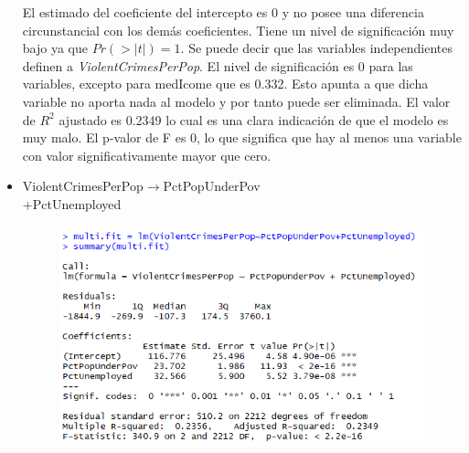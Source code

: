 \documentclass[a4paper,10pt,twocolumn]{article}
\begin{document}
\begin{itemize}
	El estimado del coeficiente del intercepto es 0 y no posee una diferencia circunstancial con los demás coeficientes. Tiene un nivel de significación muy bajo ya que  $Pr(> | t | ) =1 $.
	Se puede decir que las variables independientes definen a \textit{ViolentCrimesPerPop}. El nivel de significación es 0 para las variables, excepto para medIcome que es 0.332. Esto apunta a que dicha variable no aporta nada al modelo y por tanto puede ser eliminada. El valor de $R^2$ ajustado es 0.2349 lo cual es una clara indicación de que el modelo es muy malo. El p-valor de F es 0, lo que significa que hay al menos una variable con valor significativamente mayor que cero.

	\item {ViolentCrimesPerPop$\rightarrow$PctPopUnderPov \\ +PctUnemployed}





		\begin{figure}[H]
			\begin{center}
				\includegraphics[width=.92\columnwidth,right]{figures/multifit2.png}
			\end{center}
		\end{figure}


\end{itemize}
\end{document}

